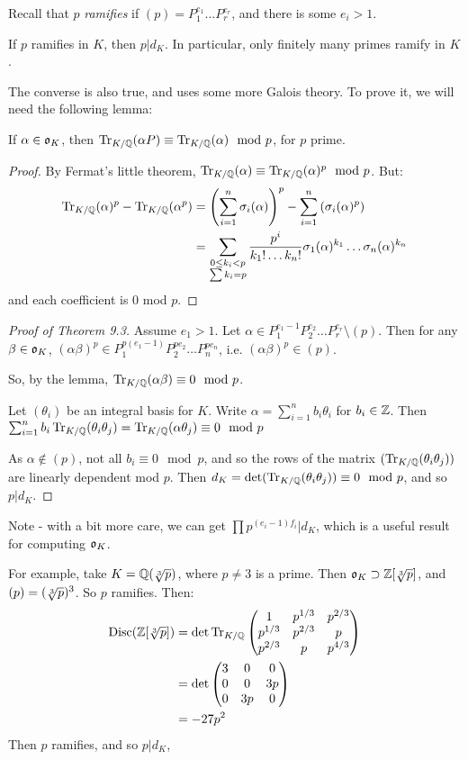 \documentclass[10pt,a4paper]{article}
\begin{document}
Recall that $p$ \emph{ramifies} if $(p) = P_1^{e_1} \ldots P_r^{e_r}$, and there is some $e_i > 1$.
\begin{theorem}
If $p$ ramifies in $K$, then $p | d_K$. In particular, only finitely many primes ramify in $K$.
\end{theorem}
The converse is also true, and uses some more Galois theory. To prove it, we will need the following lemma:
\begin{lemma}
If $\alpha \in \mathfrak{o}_K$, then $\operatorname{Tr}_{K/\mathbb{Q}}(\alpha P) \equiv \operatorname{Tr}_{K/\mathbb{Q}}(\alpha)\mod p$, for $p$ prime.
\end{lemma}
\begin{proof}
By Fermat's little theorem, $\operatorname{Tr}_{K/\mathbb{Q}}(\alpha) \equiv \operatorname{Tr}_{K/\mathbb{Q}}(\alpha)^p \mod p$. But:
\begin{align*}
\operatorname{Tr}_{K/\mathbb{Q}}(\alpha)^p - \operatorname{Tr}_{K/\mathbb{Q}}(\alpha^p) &= \left(\sum_{i=1}^n \sigma_i(\alpha)\right)^p - \sum_{i=1}^n \left(\sigma_i(\alpha)^p\right)\\
&= \sum_{\substack{0\leq k_i <p\\\sum k_i = p}} \frac{p^i}{k_1!\ldots k_n!}\sigma_1(\alpha)^{k_1}\ldots \sigma_n(\alpha)^{k_n}
\end{align*}
and each coefficient is $0$ mod $p$.
\end{proof}
\begin{proof}[Proof of Theorem 9.3]
Assume $e_1 > 1$. Let $\alpha \in P_1^{e_1-1}P_2^{e_2}\ldots P_r^{e_r} \setminus (p)$. Then for any $\beta \in \mathfrak{o}_K$, $(\alpha\beta)^p \in P_1^{p(e_1-1)}P_2^{pe_2}\ldots P_n^{pe_n}$, i.e. $(\alpha\beta)^p \in (p)$.

So, by the lemma, $\operatorname{Tr}_{K/\mathbb{Q}}(\alpha\beta) \equiv 0 \mod p$.

Let $(\theta_i)$ be an integral basis for $K$. Write $\alpha = \sum_{i=1}^n b_i \theta_i$ for $b_i \in \mathbb{Z}$. Then $\sum_{i=1}^n b_i \operatorname{Tr}_{K/\mathbb{Q}}(\theta_i\theta_j) = \operatorname{Tr}_{K/\mathbb{Q}}(\alpha \theta_j) \equiv 0 \mod p$

As $\alpha \notin (p)$, not all $b_i \equiv 0 \mod p$, and so the rows of the matrix $(\operatorname{Tr}_{K/\mathbb{Q}}(\theta_i\theta_j))$ are linearly dependent mod $p$. Then $d_K = \det(\operatorname{Tr}_{K/\mathbb{Q}}(\theta_i\theta_j)) \equiv 0 \mod p$, and so $p | d_K$.
\end{proof}
Note - with a bit more care, we can get $\prod p^{(e_i-1)f_i} |d_K$, which is a useful result for computing $\mathfrak{o}_K$.

For example, take $K = \mathbb{Q}(\sqrt[3]{p})$, where $p \neq 3$ is a prime. Then $\mathfrak{o}_K \supset \mathbb{Z}[\sqrt[3]{p}]$, and $(p) = (\sqrt[3]{p})^3$. So $p$ ramifies. Then:
\begin{align*}
\operatorname{Disc}(\mathbb{Z}[\sqrt[3]{p}]) &= \det \operatorname{Tr}_{K/\mathbb{Q}} \begin{pmatrix} 1 & p^{1/3} & p^{2/3} \\ p^{1/3} & p^{2/3} & p \\ p^{2/3} & p & p^{4/3} \end{pmatrix}\\
&= \det \begin{pmatrix}
3 & 0 & 0\\
0 & 0 & 3p\\
0 & 3p & 0
\end{pmatrix}\\
&=-27 p^2
\end{align*}
Then $p$ ramifies, and so $p | d_K$, 
\end{document}
